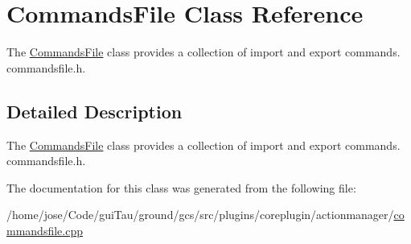 \hypertarget{class_commands_file}{\section{Commands\-File Class Reference}
\label{class_commands_file}
}


The \hyperlink{class_commands_file}{Commands\-File} class provides a collection of import and export commands.  commandsfile.\-h.  




\subsection{Detailed Description}
The \hyperlink{class_commands_file}{Commands\-File} class provides a collection of import and export commands.  commandsfile.\-h. 

The documentation for this class was generated from the following file\-:\begin{DoxyCompactItemize}
\item 
/home/jose/\-Code/gui\-Tau/ground/gcs/src/plugins/coreplugin/actionmanager/\hyperlink{commandsfile_8cpp}{commandsfile.\-cpp}\end{DoxyCompactItemize}
